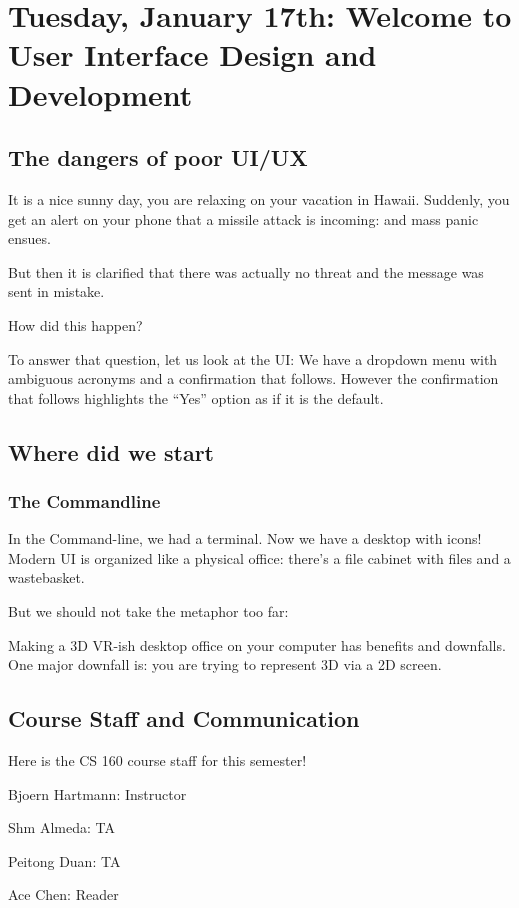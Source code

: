 \section{Tuesday, January 17th: Welcome to User Interface Design and Development}
\subsection{The dangers of poor UI/UX}
It is a nice sunny day, you are relaxing on your vacation in Hawaii. Suddenly, you get an alert on your phone that a missile attack is incoming: and mass panic ensues.

But then it is clarified that there was actually no threat and the message was sent in mistake.

How did this happen?

To answer that question, let us look at the UI: We have a dropdown menu with ambiguous acronyms and a confirmation that follows. However the confirmation that follows highlights the ``Yes'' option as if it is the default.

\subsection{Where did we start}
\subsubsection{The Commandline}
In the Command-line, we had a terminal. Now we have a desktop with icons! Modern UI is organized like a physical office: there's a file cabinet with files and a wastebasket.

\begin{important}
But we should not take the metaphor too far:

Making a 3D VR-ish desktop office on your computer has benefits and downfalls. One major downfall is: you are trying to represent 3D via a 2D screen.
\end{important}

\subsection{Course Staff and Communication}
Here is the CS 160 course staff for this semester!

Bjoern Hartmann: Instructor

Shm Almeda: TA

Peitong Duan: TA

Ace Chen: Reader

